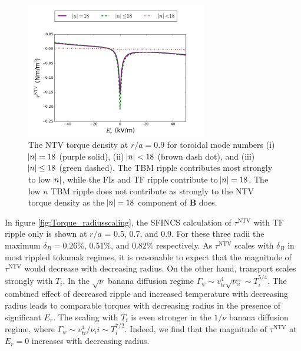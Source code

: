 \documentclass[aip, pop, preprint]{revtex4-1}
\numberwithin{figure}{section}
\numberwithin{equation}{section}
\begin{document}
\begin{figure}[h!]
\centering
\includegraphics[width=0.7\textwidth]{Torque_comparingTBMandFI.png}
\caption{\label{fig:Torque_comparingTBMandFI} The NTV torque density at $r/a = 0.9$ for toroidal mode numbers (i) $\abs{n} = 18$ (purple solid), (ii) $\abs{n} < 18$ (brown dash dot), and (iii) $\abs{n} \leq 18$ (green dashed). The TBM ripple contributes most strongly to low $\abs{n}$, while the FIs and TF ripple contribute to $\abs{n} = 18$. The low $n$ TBM ripple does not contribute as strongly to the NTV torque density as the $\abs{n} = 18$ component of $\bm{B}$ does.}
\end{figure}

In figure \ref{fig:Torque_radiusscaling}, the SFINCS calculation of $\tau^{\text{NTV}}$ with TF ripple only is shown at $r/a$ = 0.5, 0.7, and 0.9. For these three radii the maximum $\delta_B = 0.26\%$,  0.51\%, and 0.82\% respectively. As $\tau^{\text{NTV}}$ scales with $\delta_B$ in most rippled tokamak regimes, it is reasonable to expect that the magnitude of $\tau^{\text{NTV}}$ would decrease with decreasing radius. On the other hand, transport scales strongly with $T_i$. In the $\sqrt{\nu}$ banana diffusion regime\cite{Shaing2008} $\Gamma_{\psi} \sim v_{ti}^4 \sqrt{\nu_{ii}} \sim T_i^{5/4}$. The combined effect of decreased ripple and increased temperature with decreasing radius leads to comparable torques with decreasing radius in the presence of significant $E_r$.  The scaling with $T_i$ is even stronger in the $1/\nu$ banana diffusion regime\cite{Shaing2009_sbp}, where $\Gamma_{\psi} \sim v_{ti}^4/\nu_ii \sim T_i^{7/2}$. Indeed, we find that the magnitude of $\tau^{\text{NTV}}$ at $E_r = 0$ increases with decreasing radius.
 
\end{document}
